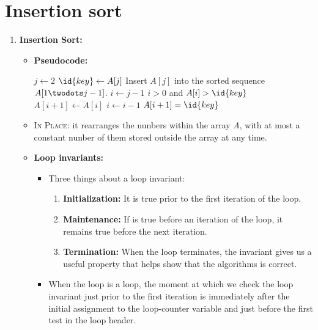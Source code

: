 \documentclass{report}
\begin{document}
\section{Insertion sort}
\begin{enumerate}[leftmargin=*]
    \item \textbf{Insertion Sort:}
    \begin{itemize}
        \item \textbf{Pseudocode:} 
        \begin{codebox}
         \label{alg:insertion-sort}
        \li \For $j \gets 2$ \To {}
            \Do 
        \li     $\id{key} \gets A[j]$ 
        \li     \Comment Insert $A[j]$ into the sorted sequence $A[1 \twodots j-1]$.
        \li     $i \gets j-1$
        \li     \While $i > 0$ and $A[i] > \id{key}$
                \Do
        \li         $A[i+1] \gets A[i]$ 
        \li         $i \gets i-1$
                \End
        \li     $A[i+1] = \id{key}$
            \End
        \end{codebox}
        \item \textsc{In Place}: it rearranges the nunbers within the array \emph{A}, with at most a constant nunber of them stored outside the array at any time. 
        \item \textbf{Loop invariants:}
        \begin{itemize}
            \item Three things about a loop invariant:
            \begin{enumerate}
                \item \textbf{Initialization:} It is true prior to the first iteration of the loop.
                \item \textbf{Maintenance:} If is true before an iteration of the loop, it remains true before the next iteration.
                \item \textbf{Termination:} When the loop terminates, the invariant gives us a useful property that helps show that the algorithms is correct.
            \end{enumerate}
            \item When the loop is a  loop, the moment at which we check the loop invariant just prior to the first iteration is immediately after the initial assignment to the loop-counter variable and just before the first test in the loop header.
        \end{itemize}
    \end{itemize}
\end{enumerate}
\end{document}

